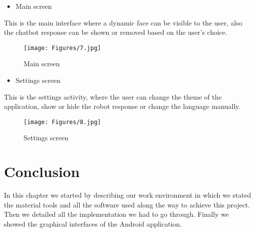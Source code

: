 \begin{itemize}
    \item Main screen
\end{itemize}
This is the main interface where a dynamic face can be visible to the user, also the chatbot response can be shown or removed based on the user's choice.
\begin{figure}[H]
\centering
\texttt{[image: Figures/7.jpg]}
\caption{Main screen}
\end{figure}
\begin{itemize}
    \item Settings screen
\end{itemize}
This is the settings activity, where the user can change the theme of the application, show or hide the robot response or change the language manually.
\begin{figure}[H]
\centering
\texttt{[image: Figures/8.jpg]}
\caption{Settings screen}
\end{figure}
\section{Conclusion}
In this chapter we started by describing our work environment in which we stated the material tools and all the software used along the way to achieve this project. Then we detailed all the implementation we had to go through. Finally we showed the graphical interfaces of the Android application. 